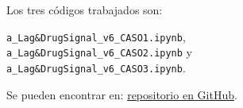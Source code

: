 \documentclass[../00_Main.tex]{subfiles}
\begin{document}
Los tres códigos trabajados son: 

\verb|a_Lag&DrugSignal_v6_CASO1.ipynb|,\\ \verb|a_Lag&DrugSignal_v6_CASO2.ipynb| y \\ \verb|a_Lag&DrugSignal_v6_CASO3.ipynb|. 

Se pueden encontrar en: \href{https://github.com/alexchavez1980/repo_tesis}{repositorio en GitHub}.


\biblio %
\end{document}
